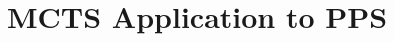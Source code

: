 \documentclass[letterpaper]{article}
\begin{document}
%
%
%

\section{MCTS Application to PPS}
\end{document}
